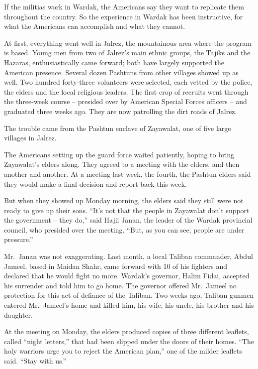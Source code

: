 \documentclass[12pt,a4paper,onecolumn]{article}
\begin{document}
If the militias work in Wardak, the Americans say they want to replicate them throughout the
country. So the experience in Wardak has been instructive, for what the Americans can accomplish and
what they cannot.

At first, everything went well in Jalrez, the mountainous area where the program is based. Young men
from two of Jalrez's main ethnic groups, the Tajiks and the Hazaras, enthusiastically came forward;
both have largely supported the American presence. Several dozen Pashtuns from other villages showed
up as well. Two hundred forty-three volunteers were selected, each vetted by the police, the elders
and the local religious leaders. The first crop of recruits went through the three-week course --
presided over by American Special Forces officers -- and graduated three weeks ago. They are now
patrolling the dirt roads of Jalrez.

The trouble came from the Pashtun enclave of Zayawalat, one of five large villages in Jalrez.

The Americans setting up the guard force waited patiently, hoping to bring Zayawalat's elders along.
They agreed to a meeting with the elders, and then another and another. At a meeting last week, the
fourth, the Pashtun elders said they would make a final decision and report back this week.

But when they showed up Monday morning, the elders said they still were not ready to give up their
sons. ``It's not that the people in Zayawalat don't support the government -- they do,'' said Hajii
Janan, the leader of the Wardak provincial council, who presided over the meeting. ``But, as you can
see, people are under pressure.''

Mr.~Janan was not exaggerating. Last month, a local Taliban commander, Abdul Jameel, based in Maidan
Shahr, came forward with 10 of his fighters and declared that he would fight no more. Wardak's
governor, Halim Fidai, accepted his surrender and told him to go home. The governor offered
Mr.~Jameel no protection for this act of defiance of the Taliban. Two weeks ago, Taliban gunmen
entered Mr.~Jameel's home and killed him, his wife, his uncle, his brother and his daughter.

At the meeting on Monday, the elders produced copies of three different leaflets, called ``night
letters,'' that had been slipped under the doors of their homes. ``The holy warriors urge you to
reject the American plan,'' one of the milder leaflets said. ``Stay with us.''
\end{document}
